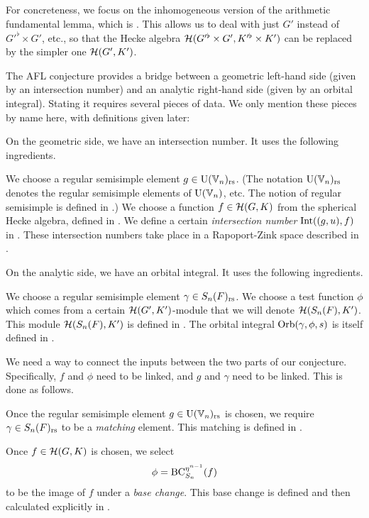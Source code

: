 For concreteness, we focus on the inhomogeneous version
of the arithmetic fundamental lemma, which is \cite[Conjecture 6.2.1]{ref:AFLspherical}.
This allows us to deal with just $G'$ instead of $G'^\flat \times G'$, etc.,
so that the Hecke algebra $\mathcal H(G'^\flat \times G', K'^\flat \times K')$
can be replaced by the simpler one $\mathcal H(G', K')$.

The AFL conjecture provides a bridge between a geometric left-hand side
(given by an intersection number)
and an analytic right-hand side (given by an orbital integral).
Stating it requires several pieces of data.
We only mention these pieces by name here, with definitions given later:
\begin{itemize}
  \ii On the geometric side, we have an intersection number.
  It uses the following ingredients.
  \begin{itemize}
    \ii We choose a regular semisimple element $g \in \operatorname{U}(\mathbb V_n)_{\mathrm{rs}}$.
    (The notation $\operatorname{U}(\mathbb V_n)_{\mathrm{rs}}$ denotes the regular semisimple elements of $\operatorname{U}(\mathbb V_n)$, etc.
    The notion of regular semisimple is defined in .)
    \ii We choose a function $f \in \mathcal H(G, K)$ from the spherical Hecke algebra,
    defined in .
    \ii We define a certain \emph{intersection number} $\operatorname{Int}((g,u), f)$
    in .
    These intersection numbers take place in a Rapoport-Zink space
    described in .
  \end{itemize}

  \ii On the analytic side, we have an orbital integral.
  It uses the following ingredients.
  \begin{itemize}
    \ii We choose a regular semisimple element $\gamma \in S_n(F)_{\mathrm{rs}}$.
    \ii We choose a test function $\phi$ which comes
    from a certain $\mathcal H(G',K')$-module that we will denote $\mathcal H(S_n(F), K')$.
    This module $\mathcal H(S_n(F), K')$ is defined in .
    \ii The orbital integral $\operatorname{Orb}(\gamma, \phi, s)$
    is itself defined in .
  \end{itemize}

  \ii We need a way to connect the inputs between the two parts of our conjecture.
  Specifically, $f$ and $\phi$ need to be linked, and $g$ and $\gamma$ need to be linked.
  This is done as follows.
  \begin{itemize}
    \ii Once the regular semisimple element $g \in \operatorname{U}(\mathbb V_n)_{\mathrm{rs}}$ is chosen,
    we require $\gamma \in S_n(F)_{\mathrm{rs}}$ to be a \emph{matching} element.
    This matching is defined in .

    \ii Once $f \in \mathcal H(G,K)$ is chosen, we select
    \[ \phi = \operatorname{BC}_{S_n}^{\eta^{n-1}}(f) \]
    to be the image of $f$ under a \emph{base change}.
    This base change is defined and then calculated explicitly in .
  \end{itemize}
\end{itemize}

